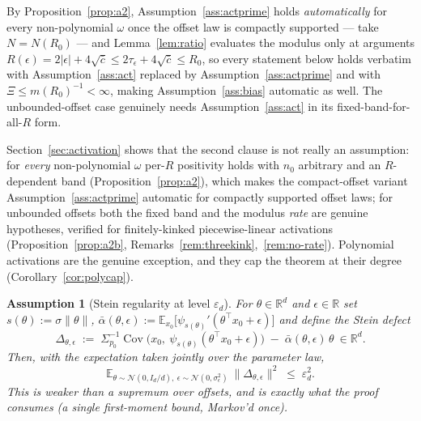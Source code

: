 \documentclass[11pt]{article}
\newtheorem{assumption}{Assumption}
\theoremstyle{remark}
\newcommand{\E}{\mathbb{E}}
\newcommand{\R}{\mathbb{R}}
\newcommand{\Cov}{\operatorname{Cov}}
\newcommand{\Sig}{\Sigma_{p_0}}
\begin{document}
\noindent By Proposition~\ref{prop:a2}, Assumption~\ref{ass:actprime} holds \emph{automatically} for every non-polynomial $\omega$ once the offset law is compactly supported --- take $N = N(R_0)$ --- and Lemma~\ref{lem:ratio} evaluates the modulus only at arguments $R(\epsilon) = 2|\epsilon| + 4\sqrt{\bar c} \le 2\tau_\epsilon + 4\sqrt{\bar c} \le R_0$, so every statement below holds verbatim with Assumption~\ref{ass:act} replaced by Assumption~\ref{ass:actprime} and with $\Xi \le m(R_0)^{-1} < \infty$, making Assumption~\ref{ass:bias} automatic as well. The unbounded-offset case genuinely needs Assumption~\ref{ass:act} in its fixed-band-for-all-$R$ form.

\noindent Section~\ref{sec:activation} shows that the second clause is not really an assumption: for \emph{every} non-polynomial $\omega$ per-$R$ positivity holds with $n_0$ arbitrary and an $R$-dependent band (Proposition~\ref{prop:a2}), which makes the compact-offset variant Assumption~\ref{ass:actprime} automatic for compactly supported offset laws; for unbounded offsets both the fixed band and the modulus \emph{rate} are genuine hypotheses, verified for finitely-kinked piecewise-linear activations (Proposition~\ref{prop:a2b}, Remarks~\ref{rem:threekink},~\ref{rem:no-rate}). Polynomial activations are the genuine exception, and they cap the theorem at their degree (Corollary~\ref{cor:polycap}).

\begin{assumption}[Stein regularity at level $\varepsilon_d$]\label{ass:stein}
For $\theta \in \R^d$ and $\epsilon \in \R$ set $s(\theta) := \sigma\lVert\theta\rVert$, $\bar\alpha(\theta,\epsilon) := \E_{x_0}\big[\psi_{s(\theta)}'(\theta^\top x_0 + \epsilon)\big]$ and define the \emph{Stein defect}
\[
\Delta_{\theta,\epsilon} \;:=\; \Sig^{-1}\Cov\!\big(x_0,\ \psi_{s(\theta)}(\theta^\top x_0 + \epsilon)\big) \;-\; \bar\alpha(\theta,\epsilon)\,\theta \ \in \R^d .
\]
Then, with the expectation taken jointly over the parameter law,
\[
\E_{\theta \sim \mathcal N(0, I_d/d),\ \epsilon \sim \mathcal N(0,\sigma_\epsilon^2)}\ \lVert\Delta_{\theta,\epsilon}\rVert^2 \;\le\; \varepsilon_d^2 .
\]
This is weaker than a supremum over offsets, and is exactly what the proof consumes (a single first-moment bound, Markov'd once).
\end{assumption}
\end{document}
